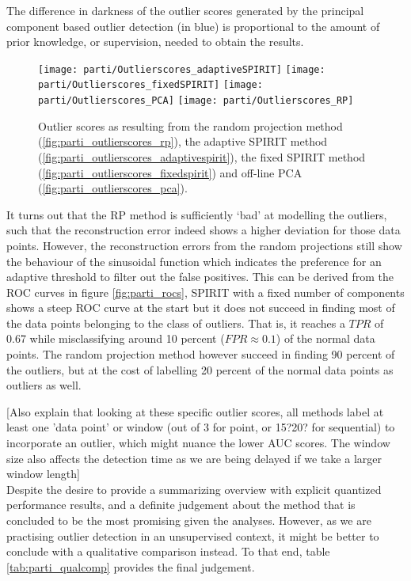 The difference in darkness of the outlier scores generated by the principal component based outlier detection (in blue) is proportional to the amount of prior knowledge, or supervision, needed to obtain the results. 

\begin{figure}[h]
	\centering
	\texttt{[image: parti/Outlierscores\_adaptiveSPIRIT]}
	\label{fig:parti_outlierscores_adaptivespirit}
	\texttt{[image: parti/Outlierscores\_fixedSPIRIT]}
	\label{fig:parti_outlierscores_fixedspirit}
	\texttt{[image: parti/Outlierscores\_PCA]}
	\label{fig:parti_outlierscores_pca}
	\texttt{[image: parti/Outlierscores\_RP]}
	\label{fig:parti_outlierscores_rp}
	\caption{Outlier scores as resulting from the random projection method (\ref{fig:parti_outlierscores_rp}), the adaptive SPIRIT method (\ref{fig:parti_outlierscores_adaptivespirit}), the fixed SPIRIT method (\ref{fig:parti_outlierscores_fixedspirit}) and off-line PCA (\ref{fig:parti_outlierscores_pca}).}
	\label{fig:parti_outlierscores}
\end{figure}


It turns out that the RP method is sufficiently `bad' at modelling the outliers, such that the reconstruction error indeed shows a higher deviation for those data points. However, the reconstruction errors from the random projections still show the behaviour of the sinusoidal function which indicates the preference for an adaptive threshold to filter out the false positives. This can be derived from the ROC curves in figure \ref{fig:parti_rocs}, SPIRIT with a fixed number of components shows a steep ROC curve at the start but it does not succeed in finding most of the data points belonging to the class of outliers. That is, it reaches a $TPR$ of 0.67 while misclassifying around 10 percent ($FPR\approx0.1$) of the normal data points. The random projection method however succeed in finding 90 percent of the outliers, but at the cost of labelling 20 percent of the normal data points as outliers as well.

[Also explain that looking at these specific outlier scores, all methods label at least one 'data point' or window (out of 3 for point, or 15?20? for sequential) to incorporate an outlier, which might nuance the lower AUC scores. 
The window size also affects the detection time as we are being delayed if we take a larger window length]\\



Despite the desire to provide a summarizing overview with explicit quantized performance results, and a definite judgement about the method that is concluded to be the most promising given the analyses. However, as we are practising outlier detection in an unsupervised context, it might be better to conclude with a qualitative comparison instead. To that end, table \ref{tab:parti_qualcomp} provides the final judgement.

